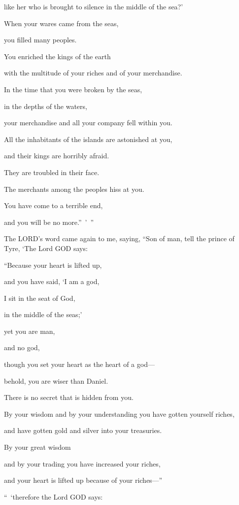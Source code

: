 like her who is brought to silence in the middle of the sea?’

\myverse{}When your wares came from the seas,

you filled many peoples.

You enriched the kings of the earth

with the multitude of your riches and of your merchandise.

\myverse{}In the time that you were broken by the seas,

in the depths of the waters,

your merchandise and all your company fell within you.

\myverse{}All the inhabitants of the islands are astonished at you,

and their kings are horribly afraid.

They are troubled in their face.

\myverse{}The merchants among the peoples hiss at you.

You have come to a terrible end,

and you will be no more.” ’ ”


\mychapter{} \myverse*{}The LORD’s word came again to me, saying,
\myverse{}“Son of man, tell the prince of Tyre, ‘The Lord GOD says:

“Because your heart is lifted up,

and you have said, ‘I am a god,

I sit in the seat of God,

in the middle of the seas;’

yet you are man,

and no god,

though you set your heart as the heart of a god—

\myverse{}behold, you are wiser than Daniel.

There is no secret that is hidden from you.

\myverse{}By your wisdom and by your understanding you have gotten yourself
riches,

and have gotten gold and silver into your treasuries.

\myverse{}By your great wisdom

and by your trading you have increased your riches,

and your heart is lifted up because of your riches—”

\myverse{}“ ‘therefore the Lord GOD says:


